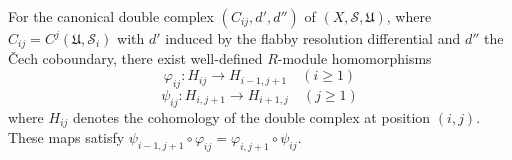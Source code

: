 For the canonical double complex $(C_{ij}, d', d'')$ of $(X, \mathcal{S}, \mathfrak{U})$, where $C_{ij} = C^j(\mathfrak{U}, \mathcal{S}_i)$ with $d'$ induced by the flabby resolution differential and $d''$ the Čech coboundary, there exist well-defined $R$-module homomorphisms
$$\varphi_{ij} : H_{ij} \rightarrow H_{i-1,j+1} \quad (i \geqslant 1)$$
$$\psi_{ij} : H_{i,j+1} \rightarrow H_{i+1,j} \quad (j \geqslant 1)$$
where $H_{ij}$ denotes the cohomology of the double complex at position $(i,j)$. These maps satisfy $\psi_{i-1,j+1} \circ \varphi_{ij} = \varphi_{i,j+1} \circ \psi_{ij}$.
